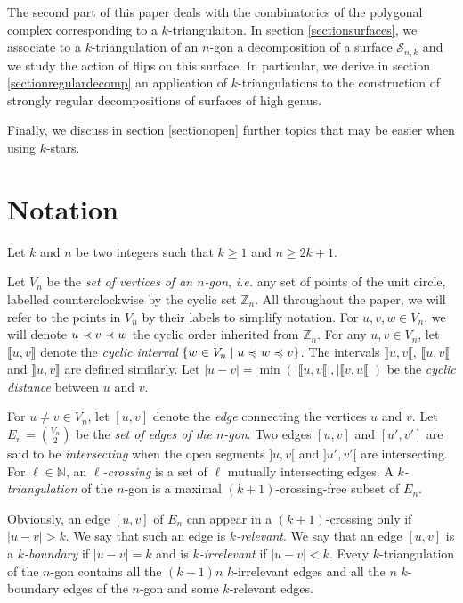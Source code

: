 \documentclass[12pt]{amsart}
\begin{document}
The second part of this paper deals with the combinatorics of the polygonal complex corresponding to a $k$-triangulaiton. In section \ref{sectionsurfaces}, we associate to a $k$-triangulation of an $n$-gon a decomposition of a surface $\mathcal{S}_{n,k}$ and we study the action of flips on this surface. In particular, we derive in section \ref{sectionregulardecomp} an application of $k$-triangulations to the construction of strongly regular decompositions of surfaces of high genus.

Finally, we discuss in section \ref{sectionopen} further topics that may be easier when using $k$-stars.






\section{Notation}\label{sectionnotation}

Let $k$ and $n$ be two integers such that $k\ge 1$ and $n\ge 2k+1$.

Let $V_n$ be the \emph{set of vertices of an $n$-gon}, {\it i.e.} any set of points of the unit circle, labelled counterclockwise by the cyclic set $\mathbb{Z}_n$.
All throughout the paper, we will refer to the points in $V_n$ by their labels to simplify notation.
For $u,v,w\in V_n$, we will denote $u\prec v\prec w$ the cyclic order inherited from $\mathbb{Z}_n$.
For any $u,v\in V_n$, let $\llbracket u,v\rrbracket$ denote the \emph{cyclic interval} $\{w\in V_n\;|\; u\preccurlyeq w\preccurlyeq v\}$.
The intervals $\rrbracket u,v\llbracket$, $\llbracket u,v\llbracket$ and $\rrbracket u,v\rrbracket$ are defined similarly.
Let $|u-v|=\min(|\llbracket u, v\llbracket|,|\llbracket v, u\llbracket|)$ be the \emph{cyclic distance} between $u$ and $v$.

For $u\ne v\in V_n$, let $[u,v]$ denote the \emph{edge} connecting the vertices $u$ and $v$.
Let $E_n={V_n \choose 2}$ be the \emph{set of edges of the $n$-gon}.
Two edges $[u,v]$ and $[u',v']$ are said to be \emph{intersecting} when the open segments $]u,v[$ and $]u',v'[$ are intersecting.
For $\ell\in\mathbb{N}$, an \emph{$\ell$-crossing} is a set of $\ell$ mutually intersecting edges.
A \emph{$k$-triangulation} of the $n$-gon is a maximal $(k+1)$-crossing-free subset of $E_n$.

Obviously, an edge $[u,v]$ of $E_n$ can appear in a $(k+1)$-crossing only if $|u-v|>k$. We say that such an edge is \emph{$k$-relevant}. We say that an edge $[u,v]$ is a \emph{$k$-boundary} if $|u-v|=k$ and is \emph{$k$-irrelevant} if $|u-v|<k$.
Every $k$-triangulation of the $n$-gon contains all the $(k-1)n$ $k$-irrelevant edges and all the $n$ $k$-boundary edges of the $n$-gon and some $k$-relevant edges.
\end{document}
